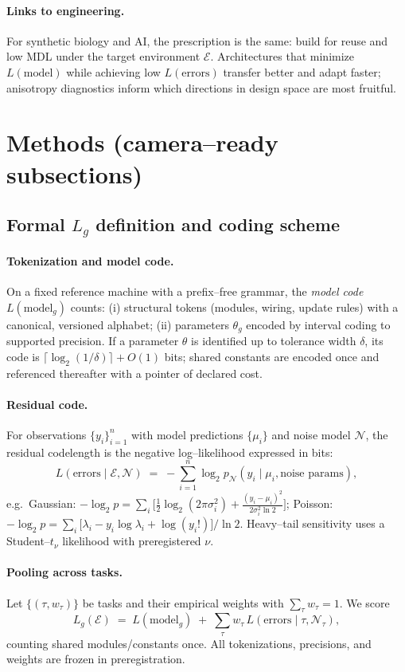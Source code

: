 \documentclass[11pt,a4paper]{article}
\begin{document}
\paragraph{Links to engineering.}
For synthetic biology and AI, the prescription is the same: build for reuse and low MDL under the target environment $\mathcal{E}$. Architectures that minimize $L(\text{model})$ while achieving low $L(\text{errors})$ transfer better and adapt faster; anisotropy diagnostics inform which directions in design space are most fruitful.


\section{Methods (camera–ready subsections)}

\subsection{Formal $L_g$ definition and coding scheme}
\paragraph{Tokenization and model code.}
On a fixed reference machine with a prefix–free grammar, the \emph{model code} $L(\text{model}_g)$ counts: (i) structural tokens (modules, wiring, update rules) with a canonical, versioned alphabet; (ii) parameters $\theta_g$ encoded by interval coding to supported precision. If a parameter $\theta$ is identified up to tolerance width $\delta$, its code is $\lceil \log_2(1/\delta)\rceil + O(1)$ bits; shared constants are encoded once and referenced thereafter with a pointer of declared cost.

\paragraph{Residual code.}
For observations $\{y_i\}_{i=1}^n$ with model predictions $\{\mu_i\}$ and noise model $\mathcal{N}$, the residual codelength is the negative log–likelihood expressed in bits:
\[
L(\text{errors}\mid \mathcal{E},\mathcal{N}) \;=\; -\sum_{i=1}^n \log_2 p_{\mathcal{N}}(y_i\mid \mu_i,\text{noise params}),
\]
e.g.\ Gaussian: $-\log_2 p = \sum_i \Big[\tfrac12\log_2(2\pi\sigma_i^2) + \tfrac{(y_i-\mu_i)^2}{2\sigma_i^2\ln 2}\Big]$; Poisson: $-\log_2 p = \sum_i \big[\lambda_i - y_i\log \lambda_i + \log(y_i!)\big]/\ln 2$. Heavy–tail sensitivity uses a Student–$t_\nu$ likelihood with preregistered $\nu$.

\paragraph{Pooling across tasks.}
Let $\{(\tau,w_\tau)\}$ be tasks and their empirical weights with $\sum_\tau w_\tau=1$. We score
\[
L_g(\mathcal{E}) \;=\; L(\text{model}_g) \;+\; \sum_{\tau} w_\tau\,L(\text{errors}\mid \tau,\mathcal{N}_\tau),
\]
counting shared modules/constants once. All tokenizations, precisions, and weights are frozen in preregistration.
\end{document}
